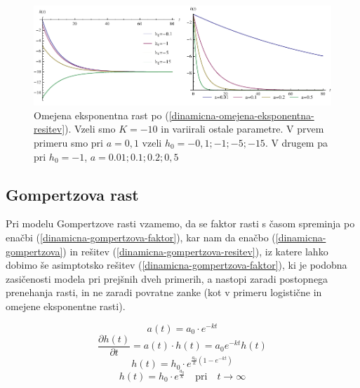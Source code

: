 \documentclass[a4paper, twoside, 12pt]{book}
\begin{document}
            \begin{figure}[h]
              \begin{center}
                \includegraphics[width=14cm]{slike/omejena-eksponentna-rast}
              \end{center}
              \caption{Omejena eksponentna rast po (\ref{dinamicna-omejena-eksponentna-resitev}). Vzeli smo $K=-10$ in variirali ostale parametre. V prvem primeru smo pri $a=0,1$ vzeli $h_0=-0,1;-1;-5;-15$. V drugem pa pri $h_0=-1$, $a=0.01;0.1;0.2;0,5$}
              \label{fig:omejena-eksponentna-rast}
            \end{figure}



          \subsection{Gompertzova rast}

          Pri modelu Gompertzove rasti vzamemo, da se faktor rasti s časom spreminja po enačbi (\ref{dinamicna-gompertzova-faktor}), kar nam da enačbo (\ref{dinamicna-gompertzova}) in rešitev (\ref{dinamicna-gompertzova-resitev}), iz katere lahko dobimo še asimptotsko rešitev (\ref{dinamicna-gompertzova-faktor}), ki je podobna zasičenosti modela pri prejšnih dveh primerih, a nastopi zaradi postopnega prenehanja rasti, in ne zaradi povratne zanke (kot v primeru logistične in omejene eksponentne rasti).

          \begin{equation}
            a(t) = a_0 \cdot e^{- k t}
            \label{dinamicna-gompertzova-faktor}
          \end{equation}
          \begin{equation}
            \frac{\partial h(t)}{\partial t} = a(t) \cdot h(t) = a_0 e^{ -k t} h(t)
            \label{dinamicna-gompertzova}
          \end{equation}
          \begin{equation}
            h(t) = h_0 \cdot e^{\frac{a_0}{k}(1-e^{-kt})}
           \label{dinamicna-gompertzova-resitev}
          \end{equation}
          \begin{equation}
            h(t) = h_0 \cdot e^{\frac{a_0}{k}} \quad \text{pri} \quad t \rightarrow \infty
            \label{dinamicna-gompertzova-limita}
          \end{equation}
\end{document}
